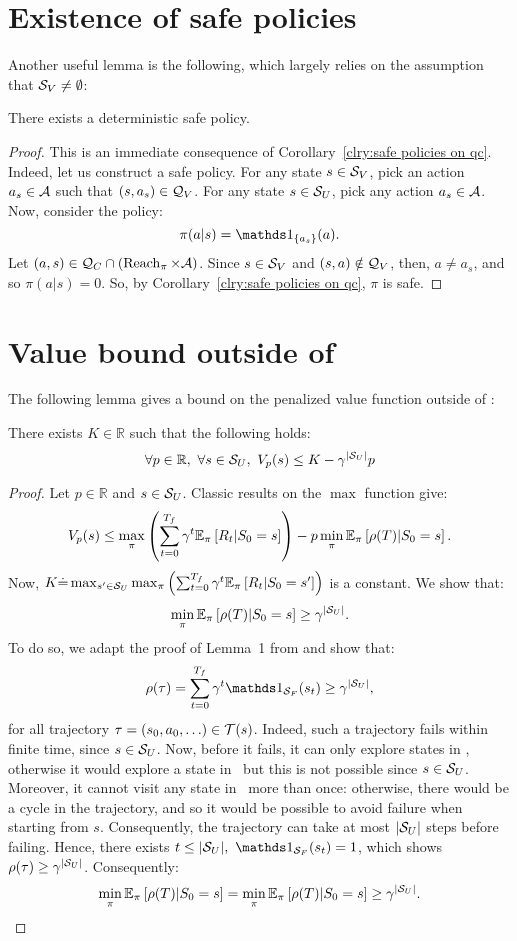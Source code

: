 \section{Existence of safe policies}
Another useful lemma is the following, which largely relies on the assumption that ${\mathcal{S}_{V}}\neq\emptyset$:
\begin{lemma}
	There exists a deterministic safe policy.
	\label{lemma:safe policy}
\end{lemma}
\begin{proof}
	This is an immediate consequence of Corollary~\ref{clry:safe policies on qc}. Indeed, let us construct a safe policy. For any state $s\in{\ensuremath{\mathcal{S}}_{V}}$, pick an action $a_s\in\mathcal{A}$ such that $(s, a_s)\in\mathcal{Q}_{V}$. For any state $s\in{\ensuremath{\mathcal{S}}_{U}}$, pick any action $a_s\in\mathcal{A}$. Now, consider the policy:
	$$
		\pi(a|s) = \indicator_{\{a_s\}}(a).
	$$
	Let $(a, s)\in\mathcal{Q}_{C}\cap(\operatorname{Reach}_\pi\times\mathcal{A})$. Since $s\in{\ensuremath{\mathcal{S}}_{V}}$ and $(s, a)\notin\mathcal{Q}_{V}$, then, $a\neq a_s$, and so $\pi(a|s) = 0$. So, by Corollary~\ref{clry:safe policies on qc}, $\pi$ is safe.
\end{proof}

\section{Value bound outside of \SV}
The following lemma gives a bound on the penalized value function outside of \SV:
\begin{lemma}[Bound on $V_p$]
	There exists $K\in\mathbb{R}$ such that the following holds:
	\begin{equation}
	\forall p\in\mathbb{R},~\forall s\in{\ensuremath{\mathcal{S}}_{U}},~V_p(s) \leq K - \gamma^{\left|{\mathcal{S}_{U}}\right|}p
	\end{equation}
	\label{lemma:value bound outside sv}
\end{lemma}
\begin{proof}
	Let $p\in\mathbb{R}$ and $s\in{\ensuremath{\mathcal{S}}_{U}}$. Classic results on the $\max$ function give:
	$$
	V_p(s) \leq \max_\pi\left(\sum_{t=0}^{{T_f}}\gamma^t\mathbb{E}_{\pi}\left[R_t\middle|S_0=s\right]\right) - p\min_\pi\mathbb{E}_{\pi}\left[\rho(T)\middle|S_0=s\right].
	$$
	Now, $K\dot{=} \max_{s'\in{\ensuremath{\mathcal{S}}_{U}}}\max_\pi\left(\sum_{t=0}^{{T_f}}\gamma^t\mathbb{E}_{\pi}\left[R_t\middle|S_0=s'\right]\right)$ is a constant. We show that:
	$$
		\min_\pi\mathbb{E}_{\pi}\left[\rho(T)\middle|S_0=s\right] \geq \gamma^{\left|{\mathcal{S}_{U}}\right|}.
	$$
	To do so, we adapt the proof of Lemma~1 from \cite{heim2020learnable} and show that: 
	$$
		\rho(\tau) = \sum_{t=0}^\Tf\gamma^t\indicator_\SF(s_t) \geq \gamma^\card{\SU},
	$$ 
	for all trajectory $\tau = (s_0, a_0, \hdots)\in\mathcal{T}(s)$. Indeed, such a trajectory fails within finite time, since $s\in{\ensuremath{\mathcal{S}}_{U}}$. Now, before it fails, it can only explore states in \SU, otherwise it would explore a state in \SV~but this is not possible since $s\in{\ensuremath{\mathcal{S}}_{U}}$. Moreover, it cannot visit any state in \SU~more than once: otherwise, there would be a cycle in the trajectory, and so it would be possible to avoid failure when starting from $s$. Consequently, the trajectory can take at most ${\left|{\mathcal{S}_{U}}\right|}$ steps before failing. Hence, there exists $t\leq\card{\SU},~\indicator_\SF(s_t) = 1$, which shows $\rho(\tau) \geq \gamma^{\left|{\mathcal{S}_{U}}\right|}$. Consequently: 
	$$\min_\pi\mathbb{E}_{\pi}\left[\rho(T)\middle|S_0=s\right] = \min_\pi\mathbb{E}_{\pi}\left[\rho(T)\middle|S_0=s\right] \geq \gamma^{\left|{\mathcal{S}_{U}}\right|}.$$
\end{proof}

